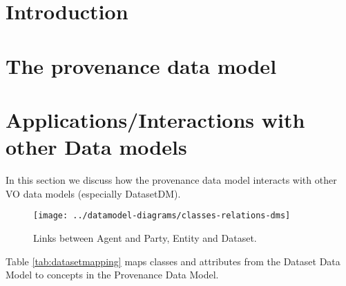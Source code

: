 \documentclass[11pt,a4paper]{ivoa}
\newcommand{\TODO}[1]{%
    \noindent%
    \colorbox{todocolor}{%
            \parbox{0.85\linewidth}{\sffamily \textbf{TODO:}\\
            #1}
    }%
    \vspace{2pt}

}
\begin{document}
\section{Introduction}





\section{The provenance data model}




\section{Applications/Interactions with other Data models}\label{sec:dmlinks}
In this section we discuss how the provenance data model interacts with
other VO data models (especially DatasetDM).


\begin{figure}[h]
\centering
\texttt{[image: ../datamodel-diagrams/classes-relations-dms]}
\caption{Links between Agent and Party, Entity and Dataset.}
\label{fig:class-relations-dm}
\end{figure}


Table \ref{tab:datasetmapping} maps classes and attributes from the Dataset Data Model to concepts in the Provenance Data Model.
\end{document}
